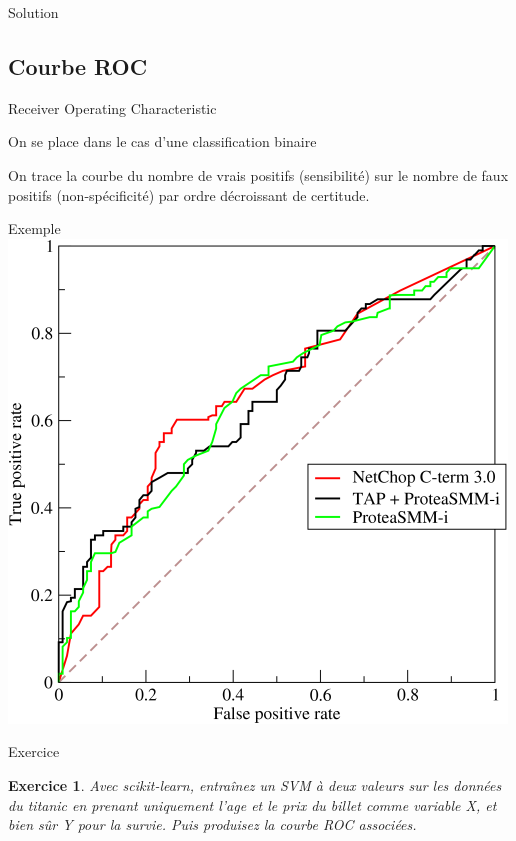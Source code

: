 \documentclass[11pt]{beamer}
\newtheorem{exercice}{Exercice}
\newcommand{\Python}[1]{
	{\small	}
}
\begin{document}
\begin{frame}{Solution}
\Python{ext4}
\end{frame}

\subsection{Courbe ROC}

\begin{frame}{Receiver Operating Characteristic}

On se place dans le cas d'une classification binaire\\

\vspace{0.2cm}

On trace la courbe du nombre de vrais positifs (sensibilité) sur le nombre de faux positifs (non-spécificité) par ordre décroissant de certitude.

\end{frame}

\begin{frame}{Exemple}
\includegraphics[scale=1.5]{ROC}
\end{frame}

\begin{frame}{Exercice}
\begin{exercice}
Avec scikit-learn, entraînez un SVM à deux valeurs sur les données du titanic en prenant uniquement l'age et le prix du billet comme variable X, et bien sûr Y pour la survie. Puis produisez la courbe ROC associées.
\end{exercice}


\end{frame}
\end{document}
